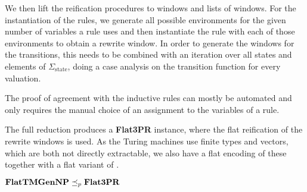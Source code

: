 We then lift the reification procedures to windows and lists of windows.
For the instantiation of the rules, we generate all possible environments for the given number of variables a rule uses and then instantiate the rule with each of those environments to obtain a rewrite window.
In order to generate the windows for the transitions, this needs to be combined with an iteration over all states and elements of $\Sigma_{\text{state}}$, doing a case analysis on the transition function for every valuation.

The proof of agreement with the inductive rules can mostly be automated and only requires the manual choice of an assignment to the variables of a rule.

The full reduction produces a \textbf{Flat3PR} instance, where the flat reification of the rewrite windows is used. As the Turing machines use finite types and vectors, which are both not directly extractable, we also have a flat encoding of these together with a flat variant  of \gennp{}.

\begin{theorem}
  $\textbf{FlatTMGenNP} \preceq_p{} \textbf{Flat3PR}$
\end{theorem}



